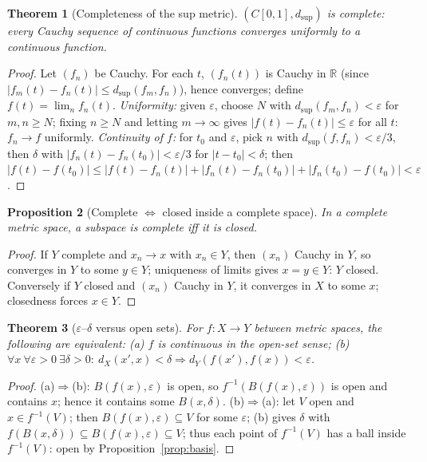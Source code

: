 \documentclass[11pt,a4paper]{article}
\newtheorem{theorem}{Theorem}[section]
\newtheorem{proposition}[theorem]{Proposition}
\theoremstyle{definition}
\newcommand{\R}{\mathbb{R}}
\begin{document}
	\begin{theorem}[Completeness of the sup metric]\label{thm:sup-complete}
		$(C[0,1],d_{\sup})$ is complete: every Cauchy sequence of continuous functions converges uniformly to a continuous function.
	\end{theorem}
	\begin{proof}
		Let $(f_n)$ be Cauchy. For each $t$, $(f_n(t))$ is Cauchy in $\R$ (since $|f_m(t)-f_n(t)|\le d_{\sup}(f_m,f_n)$),
		hence converges; define $f(t)=\lim_n f_n(t)$. \emph{Uniformity:} given $\varepsilon$, choose $N$ with
		$d_{\sup}(f_m,f_n)<\varepsilon$ for $m,n\ge N$; fixing $n\ge N$ and letting $m\to\infty$ gives
		$|f(t)-f_n(t)|\le\varepsilon$ for all $t$: $f_n\to f$ uniformly. \emph{Continuity of $f$:} for $t_0$ and
		$\varepsilon$, pick $n$ with $d_{\sup}(f,f_n)<\varepsilon/3$, then $\delta$ with $|f_n(t)-f_n(t_0)|<\varepsilon/3$
		for $|t-t_0|<\delta$; then $|f(t)-f(t_0)|\le|f(t)-f_n(t)|+|f_n(t)-f_n(t_0)|+|f_n(t_0)-f(t_0)|<\varepsilon$.
	\end{proof}
	
	\begin{proposition}[Complete $\iff$ closed inside a complete space]\label{prop:complete-closed}
		In a complete metric space, a subspace is complete iff it is closed.
	\end{proposition}
	\begin{proof}
		If $Y$ complete and $x_n\to x$ with $x_n\in Y$, then $(x_n)$ Cauchy in $Y$, so converges in $Y$ to some
		$y\in Y$; uniqueness of limits gives $x=y\in Y$: $Y$ closed. Conversely if $Y$ closed and $(x_n)$ Cauchy
		in $Y$, it converges in $X$ to some $x$; closedness forces $x\in Y$.
	\end{proof}
	
	\begin{theorem}[$\varepsilon$--$\delta$ versus open sets]\label{thm:eps-delta}
		For $f:X\to Y$ between metric spaces, the following are equivalent: (a) $f$ is continuous in the
		open-set sense; (b) $\forall x\ \forall\varepsilon>0\ \exists\delta>0:\ d_X(x',x)<\delta\Rightarrow d_Y(f(x'),f(x))<\varepsilon$.
	\end{theorem}
	\begin{proof}
		(a)$\Rightarrow$(b): $B(f(x),\varepsilon)$ is open, so $f^{-1}(B(f(x),\varepsilon))$ is open and contains $x$;
		hence it contains some $B(x,\delta)$. (b)$\Rightarrow$(a): let $V$ open and $x\in f^{-1}(V)$; then
		$B(f(x),\varepsilon)\subseteq V$ for some $\varepsilon$; (b) gives $\delta$ with
		$f(B(x,\delta))\subseteq B(f(x),\varepsilon)\subseteq V$; thus each point of $f^{-1}(V)$ has a ball inside
		$f^{-1}(V)$: open by Proposition~\ref{prop:basis}.
	\end{proof}
	
\end{document}
